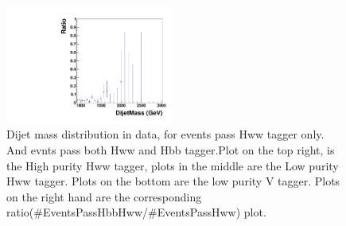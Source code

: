 \begin{figure}[htb]
\begin{center}
\includegraphics[width=0.49\textwidth]{HqqqqZqqfigs/HbbHww/LowVPurityRatio.pdf}
\end{center}
\caption{
Dijet mass distribution in data, for events pass Hww tagger only. And evnts pass both Hww and Hbb tagger.Plot on the top right, is the High purity Hww tagger, plots in the middle are the Low purity Hww tagger. Plots on the bottom are the low purity V tagger.  Plots on 
the right hand are the corresponding ratio(#EventsPassHbbHww/#EventsPassHww) plot.  
}
\label{fig:HbbRatio}
\end{figure}

\clearpage

